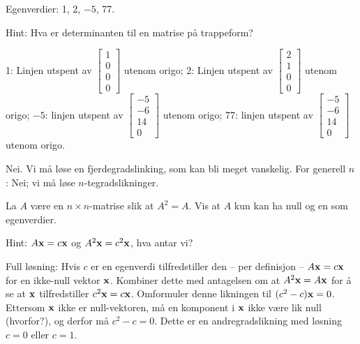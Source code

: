 \begin{losning}

\begin{punkt}
Egenverdier: 1, 2, $-5$, 77. 

\noindent
Hint: Hva er determinanten til en matrise på trappeform?
\end{punkt}

\begin{punkt}

1: Linjen utspent av $\begin{bmatrix}
1\\
0\\
0\\
0
\end{bmatrix}$ utenom origo; 2: Linjen utspent av $\begin{bmatrix}
2\\
1\\
0\\
0
\end{bmatrix}$ utenom origo; $-5$: linjen utspent av $\begin{bmatrix}
-5\\
-6\\
14\\
0
\end{bmatrix}$ utenom origo; 77: linjen utspent av $\begin{bmatrix}
-5\\
-6\\
14\\
0
\end{bmatrix}$ utenom origo.

\end{punkt}

\begin{punkt}
Nei. Vi må løse en fjerdegradslinking, som kan bli meget vanskelig. For generell $n$: Nei; vi må løse $n$-tegradslikninger.
\end{punkt}

\end{losning}



\begin{oppgave}
La $A$ være en $n\times n$-matrise slik at $A^2=A$. Vis at $A$ kun kan ha null og en som egenverdier.

\noindent
Hint: $A\mathbf{x}=c\mathbf{x}$ og $A^2\mathbf{x}=c^2\mathbf{x}$, hva antar vi?
\end{oppgave}

\begin{losning}
Full løsning: Hvis $c$ er en egenverdi tilfredstiller den -- per definisjon -- $A\mathbf{x}=c\mathbf{x}$ for en ikke-null vektor $\mathbf{x}$. Kombiner dette med antagelsen om at $A^2\mathbf{x}=A\mathbf{x}$ for å se at $\mathbf{x}$ tilfredstiller $c^2\mathbf{x}=c\mathbf{x}$. Omformuler denne likningen til $(c^2-c)\mathbf{x}=0$. Ettersom $\mathbf{x}$ ikke er null-vektoren, må en komponent i $\mathbf{x}$ ikke være lik null (hvorfor?), og derfor må $c^2-c=0$. Dette er en andregradslikning med løsning $c=0$ eller $c=1$.
\end{losning}

